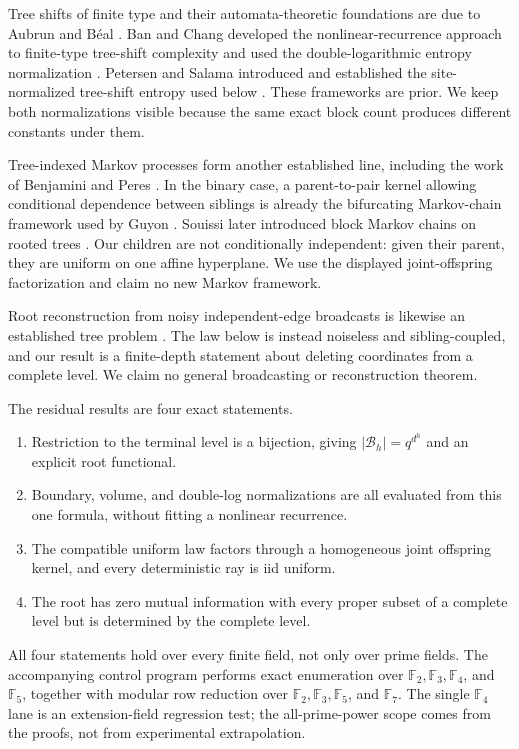 \documentclass[11pt,a4paper]{amsart}
\theoremstyle{definition}
\theoremstyle{remark}
\newcommand{\F}{\mathbb F}
\newcommand{\cB}{\mathcal B}
\begin{document}
Tree shifts of finite type and their automata-theoretic foundations are due
to Aubrun and B\'eal \cite{AubrunBeal2012}.  Ban and Chang developed the
nonlinear-recurrence approach to finite-type tree-shift complexity and used
the double-logarithmic entropy normalization \cite{BanChang2017}.  Petersen
and Salama introduced and established the site-normalized tree-shift entropy
used below \cite{PetersenSalama2018}.  These frameworks are prior.  We keep
both normalizations visible because the same exact block count produces
different constants under them.

Tree-indexed Markov processes form another established line, including the
work of Benjamini and Peres \cite{BenjaminiPeres1994}.  In the binary case,
a parent-to-pair kernel allowing conditional dependence between siblings is
already the bifurcating Markov-chain framework used by Guyon
\cite{Guyon2007}.  Souissi later introduced block Markov chains on rooted
trees \cite{Souissi2022}.  Our children are not conditionally independent:
given their parent, they are uniform on one affine hyperplane.  We use the
displayed joint-offspring factorization and claim no new Markov framework.

Root reconstruction from noisy independent-edge broadcasts is likewise an
established tree problem \cite{EvansEtAl2000}.  The law below is instead
noiseless and sibling-coupled, and our result is a finite-depth statement
about deleting coordinates from a complete level.  We claim no general
broadcasting or reconstruction theorem.

The residual results are four exact statements.
\begin{enumerate}
\item Restriction to the terminal level is a bijection, giving
      $|\cB_h|=q^{d^h}$ and an explicit root functional.
\item Boundary, volume, and double-log normalizations are all evaluated
      from this one formula, without fitting a nonlinear recurrence.
\item The compatible uniform law factors through a homogeneous joint
      offspring kernel, and every deterministic ray is iid uniform.
\item The root has zero mutual information with every proper subset of a
      complete level but is determined by the complete level.
\end{enumerate}
All four statements hold over every finite field, not only over prime
fields.  The accompanying control program performs exact enumeration over
$\F_2,\F_3,\F_4$, and $\F_5$, together with modular row reduction over
$\F_2,\F_3,\F_5$, and $\F_7$.  The single $\F_4$ lane is an extension-field
regression test; the all-prime-power scope comes from the proofs, not from
experimental extrapolation.
\end{document}
